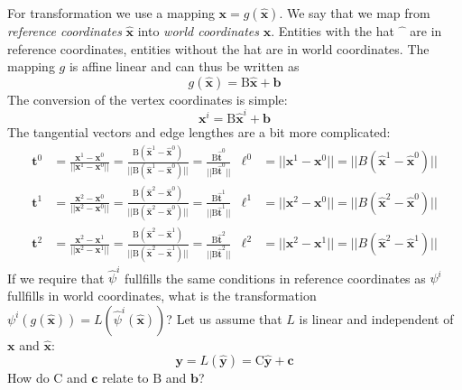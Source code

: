 \documentclass{scrartcl}
\begin{document}
For transformation we use a mapping $\mathbf x=g(\mathbf{\hat x})$.  We say
that we map from {\em reference coordinates} $\mathbf{\hat x}$ into {\em world
  coordinates} $\mathbf x$.  Entities with the hat $\hat{\phantom x}$ are in
reference coordinates, entities without the hat are in world coordinates.  The
mapping $g$ is affine linear and can thus be written as
\begin{equation}
  g(\mathbf{\hat x})=\mathrm B\mathbf{\hat x}+\mathbf b
\end{equation}
The conversion of the vertex coordinates is simple:
\begin{equation}
  \mathbf x^i=\mathrm B\mathbf{\hat x}^i+\mathbf b
\end{equation}
The tangential vectors and edge lengthes are a bit more complicated:
\begin{subequations}
  \begin{align}
    \mathbf t^0&
      =\frac{\mathbf x^1-\mathbf x^0}{||\mathbf x^1-\mathbf x^0||}
      =\frac{\mathrm B(\mathbf{\hat x}^1-\mathbf{\hat x}^0)}
            {||\mathrm B(\mathbf{\hat x}^1-\mathbf{\hat x}^0)||}
      =\frac{\mathrm B\mathbf{\hat t}^0}{||\mathrm B\mathbf{\hat t}^0||}
    &  \ell^0&=||\mathbf x^1-\mathbf x^0||
              =||B(\mathbf{\hat x}^1-\mathbf{\hat x}^0)||               \\
    \mathbf t^1&
      =\frac{\mathbf x^2-\mathbf x^0}{||\mathbf x^2-\mathbf x^0||}
      =\frac{\mathrm B(\mathbf{\hat x}^2-\mathbf{\hat x}^0)}
            {||\mathrm B(\mathbf{\hat x}^2-\mathbf{\hat x}^0)||}
      =\frac{\mathrm B\mathbf{\hat t}^1}{||\mathrm B\mathbf{\hat t}^1||}
    &  \ell^1&=||\mathbf x^2-\mathbf x^0||
              =||B(\mathbf{\hat x}^2-\mathbf{\hat x}^0)||               \\
    \mathbf t^2&
      =\frac{\mathbf x^2-\mathbf x^1}{||\mathbf x^2-\mathbf x^1||}
      =\frac{\mathrm B(\mathbf{\hat x}^2-\mathbf{\hat x}^1)}
            {||\mathrm B(\mathbf{\hat x}^2-\mathbf{\hat x}^1)||}
      =\frac{\mathrm B\mathbf{\hat t}^2}{||\mathrm B\mathbf{\hat t}^2||}
    &  \ell^2&=||\mathbf x^2-\mathbf x^1||
              =||B(\mathbf{\hat x}^2-\mathbf{\hat x}^1)||
  \end{align}
\end{subequations}
If we require that $\hat\psi^i$ fullfills the same conditions in reference
coordinates as $\psi^i$ fullfills in world coordinates, what is the
transformation $\psi^i(g(\mathbf{\hat x}))=L(\hat\psi^i(\mathbf{\hat x}))$?
Let us assume that $L$ is linear and independent of $\mathbf x$ and
$\mathbf{\hat x}$:
\begin{equation}
  \mathbf y=L(\mathbf{\hat y})=\mathrm C\mathbf{\hat y}+\mathbf c
\end{equation}
How do $\mathrm C$ and $\mathbf c$ relate to $\mathrm B$ and $\mathbf b$?  
\end{document}
